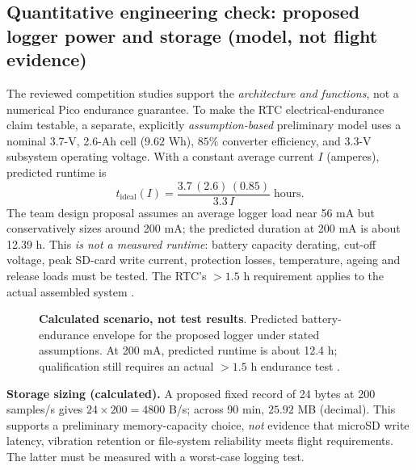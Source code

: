 \documentclass[10pt,a4paper]{article}
\begin{document}
\subsection{Quantitative engineering check: proposed logger power and storage (model, not flight evidence)}
The reviewed competition studies support the \emph{architecture and functions}, not a numerical Pico endurance guarantee. To make the RTC electrical-endurance claim testable, a separate, explicitly \emph{assumption-based} preliminary model uses a nominal 3.7-V, 2.6-Ah cell ($9.62$ Wh), $85\%$ converter efficiency, and $3.3$-V subsystem operating voltage. With a constant average current $I$ (amperes), predicted runtime is
\[
 t_{\mathrm{ideal}}(I)=\frac{3.7\,(2.6)\,(0.85)}{3.3\,I}\;\mathrm{hours}.
\]
The team design proposal assumes an average logger load near 56 mA but conservatively sizes around 200 mA; the predicted duration at 200 mA is about 12.39 h. This \emph{is not a measured runtime}: battery capacity derating, cut-off voltage, peak SD-card write current, protection losses, temperature, ageing and release loads must be tested. The RTC's $>1.5$ h requirement applies to the actual assembled system \cite{rtc2027rules,rpicopico}.

\begin{figure}[htbp]\centering
{}
\caption{\textbf{Calculated scenario, not test results}. Predicted battery-endurance envelope for the proposed logger under stated assumptions. At 200 mA, predicted runtime is about 12.4 h; qualification still requires an actual $>1.5$ h endurance test \cite{rtc2027rules,rpicopico}.}
\label{fig:power}
\end{figure}

\textbf{Storage sizing (calculated).} A proposed fixed record of 24 bytes at 200 samples/s gives $24\times200=4800$ B/s; across 90 min, $25.92$ MB (decimal). This supports a preliminary memory-capacity choice, \emph{not} evidence that microSD write latency, vibration retention or file-system reliability meets flight requirements. The latter must be measured with a worst-case logging test.
\end{document}
